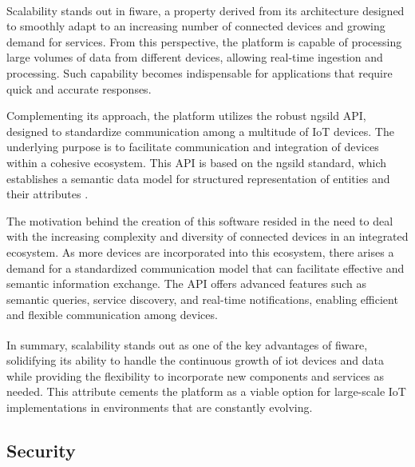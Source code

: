 Scalability stands out in \acrshort{fiware}\textsuperscript{\textregistered}, a property derived from its architecture designed to smoothly adapt to an increasing number of connected devices and growing demand for services. From this perspective, the platform is capable of processing large volumes of data from different devices, allowing real-time ingestion and processing. Such capability becomes indispensable for applications that require quick and accurate responses.

Complementing its approach, the platform utilizes the robust \acrfull{ngsild} API, designed to standardize communication among a multitude of IoT devices. The underlying purpose is to facilitate communication and integration of devices within a cohesive ecosystem. This API is based on the \acrshort{ngsild} standard, which establishes a semantic data model for structured representation of entities and their attributes \cite{etsi2023}.

The motivation behind the creation of this software resided in the need to deal with the increasing complexity and diversity of connected devices in an integrated ecosystem. As more devices are incorporated into this ecosystem, there arises a demand for a standardized communication model that can facilitate effective and semantic information exchange. The API offers advanced features such as semantic queries, service discovery, and real-time notifications, enabling efficient and flexible communication among devices.

In summary, scalability stands out as one of the key advantages of \acrshort{fiware}\textsuperscript{\textregistered}, solidifying its ability to handle the continuous growth of \acrfull{iot} devices and data while providing the flexibility to incorporate new components and services as needed. This attribute cements the platform as a viable option for large-scale IoT implementations in environments that are constantly evolving.

\subsection{Security}\label{section:softwareArchitecture-security}

